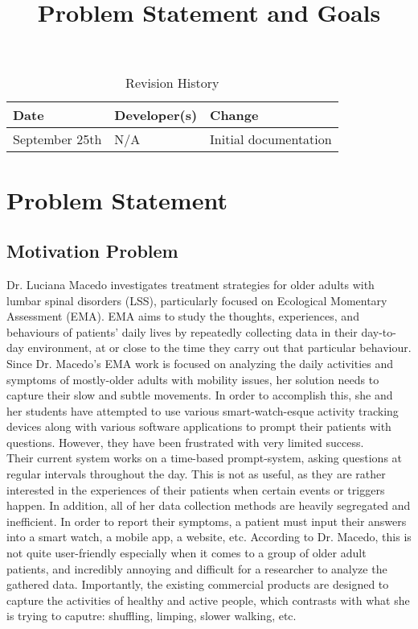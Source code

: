 \documentclass[12pt]{article}
\title{Problem Statement and Goals\\\progname}
\author{\authname}
\date{}
\begin{document}
\maketitle

\begin{table}[hp]
    \caption{Revision History} \label{TblRevisionHistory}
    \begin{tabularx}{\textwidth}{llX}
        \toprule
        \textbf{Date}  & \textbf{Developer(s)} & \textbf{Change}       \\
        \midrule
        September 25th & N/A                   & Initial documentation \\
        \bottomrule
    \end{tabularx}
\end{table}

\newpage

\section{Problem Statement}

\subsection{Motivation Problem}

Dr. Luciana Macedo investigates treatment strategies for older adults with  lumbar spinal disorders (LSS), particularly focused on Ecological Momentary Assessment (EMA). EMA aims to study the thoughts, experiences, and behaviours of patients' daily lives by repeatedly collecting data in their day-to-day environment, at or close to the time they carry out that particular behaviour.\\

Since Dr. Macedo's EMA work is focused on analyzing the daily activities and symptoms of mostly-older adults with mobility issues, her solution needs to capture their slow and subtle movements. In order to accomplish this, she and her students have attempted to use various smart-watch-esque activity tracking devices along with various software applications to prompt their patients with questions. However, they have been frustrated with very limited success.\\

Their current system works on a time-based prompt-system, asking questions at regular intervals throughout the day. This is not as useful, as they are rather interested in the experiences of their patients when certain events or triggers happen. In addition, all of her data collection methods are heavily segregated and inefficient. In order to report their symptoms, a patient must input their answers into a smart watch, a mobile app, a website, etc. According to Dr. Macedo, this is not quite user-friendly especially when it comes to a group of older adult patients, and incredibly annoying and difficult for a researcher to analyze the gathered data. Importantly, the existing commercial products are designed to capture the activities of healthy and active people, which contrasts with what she is trying to caputre: shuffling, limping, slower walking, etc.\\
\end{document}
